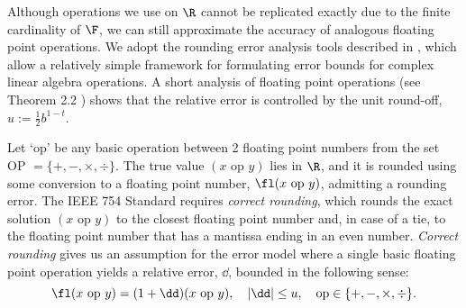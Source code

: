 Although operations we use on $\R$ cannot be replicated exactly due to the finite cardinality of $\F$, we can still approximate the accuracy of analogous floating point operations.
We adopt the rounding error analysis tools described in \cite{Higham2002}, which allow a relatively simple framework for formulating error bounds for complex linear algebra operations. 
A short analysis of floating point operations (see Theorem 2.2 \cite{Higham2002}) shows that the relative error is 
controlled by the unit round-off, $u:=\frac{1}{2}b^{1-t}$. \par 

Let `op' be any basic operation between 2 floating point numbers from the set OP $=\{+, -, \times, \div\}$.
The true value $(x\text{ op }y)$ lies in $\R$, and it is rounded using some conversion to a floating point number, $\fl(x\text{ op }y)$, admitting a rounding error. 
The IEEE 754 Standard requires \emph{correct rounding}, which rounds the exact solution $(x\text{ op }y)$ to the closest floating point number and, in case of a tie, to the floating point number that has a mantissa ending in an even number.
\emph{Correct rounding} gives us an assumption for the error model where a single basic floating point operation yields a relative error, $\dd$, bounded in the following sense:
\begin{equation}
\fl(x\text{ op }y) = (1 + \dd)(x\text{ op }y),\quad |\dd|\leq u, \quad \text{op}\in\{+, -, \times, \div\}. \label{eqn:singlefpe}
\end{equation}

